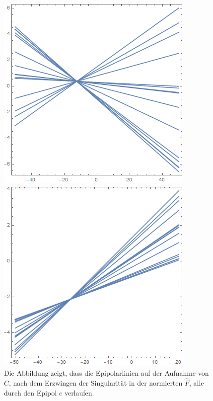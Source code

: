 

\begin{figure}[!htb]
	\includegraphics[width=\linewidth]{images/L_PC1_F_Constraint.png}
	\caption[Epipolarlinien in $C$ aus singulärer Fundamentalmatrix]{Die Abbildung zeigt, dass die Epipolarlinien auf der Aufnahme von $C$, nach dem Erzwingen der Singularität in der normierten $\hat{F}$, alle durch den Epipol $e$ verlaufen.}
	\label{fig:EpipoleWithF1}
	\endminipage\hfill
	\includegraphics[width=\linewidth]{images/LPrime_PC2_F_Constraint.png}

\end{figure}
